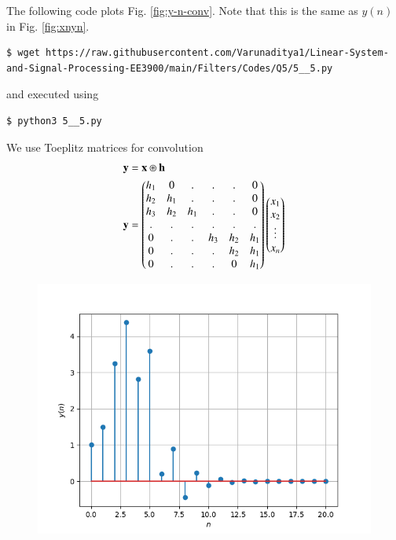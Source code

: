 \documentclass[journal,12pt,twocolumn]{IEEEtran}
\renewcommand\thesection{\arabic{section}}
\begin{document}
\begin{enumerate}[label=\thesection.\arabic*]
\solution The following code plots Fig. \eqref{fig:y-n-conv}. Note that this is
the same as $y(n)$ in  Fig. \eqref{fig:xnyn}.
\begin{lstlisting}
$ wget https://raw.githubusercontent.com/Varunaditya1/Linear-System-and-Signal-Processing-EE3900/main/Filters/Codes/Q5/5__5.py
\end{lstlisting}
and executed using
\begin{lstlisting}
$ python3 5__5.py
\end{lstlisting}
We use Toeplitz matrices for convolution
\begin{align}
	\mathbf{y} &= \mathbf{x} \circledast \mathbf{h}\\
	\mathbf{y} &= 
	\begin{pmatrix}
		h_1 & 0 & . & . & . & 0 \\
		h_2 & h_1 & . & . & . & 0 \\
		h_3 & h_2 & h_1 & . & . & 0 \\
		. & . & . & . & . & . \\
		0 & . & . & h_3 & h_2 & h_1 \\
		0 & . & . & . & h_2 & h_1 \\
		0 & . & . & . & 0 & h_1
	\end{pmatrix}
	\begin{pmatrix}
		x_1 \\ x_2 \\ \vdots \\ x_n
	\end{pmatrix}
\end{align}
\begin{figure}[!ht]
	\centering
	\includegraphics[width=\columnwidth]{Figures/Q5/5__5.png}

\end{figure}
\end{enumerate}
\end{document}
